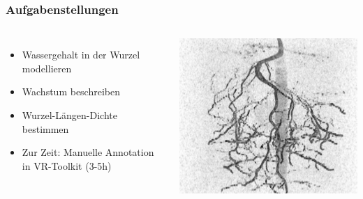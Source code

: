 \documentclass[final,ngerman,ignorenonframetext,compress]{beamer}
\begin{document}
\begin{frame}
	\frametitle{Aufgabenstellungen}
	\begin{columns}
		\begin{itemize}
			\item Wassergehalt in der Wurzel modellieren
			\item Wachstum beschreiben
			\item Wurzel-L\"angen-Dichte bestimmen
		  \item Zur Zeit: Manuelle Annotation in VR-Toolkit (3-5h)
		\end{itemize}
		\includegraphics[width=\linewidth]{img/raw-4.png}
	\end{columns}
\end{frame}
\end{document}
